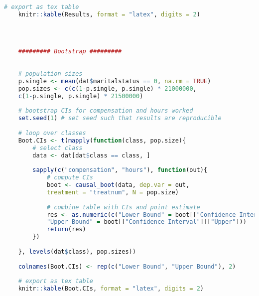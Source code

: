 \documentclass[aodsor,preprint]{imsart}
\numberwithin{equation}{section}
\theoremstyle{plain}
\begin{document}
\begin{lstlisting}[language=R, basicstyle=\tiny\tiny]
	# export as tex table
	knitr::kable(Results, format = "latex", digits = 2)
	
	
	
	
	######### Bootstrap #########
	
	
	# population sizes
	p.single <- mean(dat$maritalstatus == 0, na.rm = TRUE)
	pop.sizes <- c(c(1-p.single, p.single) * 21000000,
	c(1-p.single, p.single) * 21500000)
	
	# bootstrap CIs for compensation and hours worked
	set.seed(1) # set seed such that results are reproducible
	
	# loop over classes
	Boot.CIs <- t(mapply(function(class, pop.size){
		# select class
		data <- dat[dat$class == class, ]
		
		sapply(c("compensation", "hours"), function(out){
			# compute CIs
			boot <- causal_boot(data, dep.var = out,
			treatment = "treatnum", N = pop.size)
			
			# combine table with CIs and point estimate
			res <- as.numeric(c("Lower Bound" = boot[["Confidence Interval"]]["Lower"],
			"Upper Bound" = boot[["Confidence Interval"]]["Upper"]))
			return(res)
		})
		
	}, levels(dat$class), pop.sizes))
	
	colnames(Boot.CIs) <- rep(c("Lower Bound", "Upper Bound"), 2)
	
	# export as tex table
	knitr::kable(Boot.CIs, format = "latex", digits = 2)
	
	
\end{lstlisting}


\newpage

{}
\end{document}
